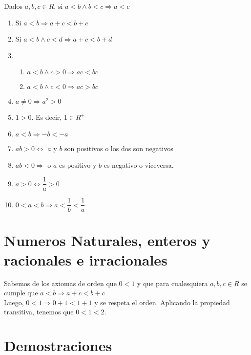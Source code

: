 \documentclass[10pt]{article}
\begin{document}
\newpage

\begin{theo}{}
Dados $a,b,c \in R$, si $a<b \land b<c \Rightarrow a<c$
\begin{multicols}{2}
\begin{enumerate}
\item Si $a<b \Rightarrow a+c < b+c$
\item Si $a<b \land c<d \Rightarrow a+c < b+d$
\item \begin{enumerate}
\item $a<b \land c>0 \Rightarrow ac < bc$
\item $a<b \land c<0 \Rightarrow ac > bc$
\end{enumerate}
\item $a \not = 0 \Rightarrow a^2 > 0$
\item $1 > 0$. Es decir, $1 \in R^+$
\item $a < b \Rightarrow -b < -a$
\item $ab > 0 \iff$ $a$ y $b$ son positivos o los dos son negativos
\item $ab < 0 \Rightarrow$ o $a$ es positivo y $b$ es negativo o viceversa.
\item $a>0 \iff \dfrac{1}{a} > 0$
\item $0<a<b \Rightarrow a<\dfrac{1}{b}<\dfrac{1}{a}$
\end{enumerate}
\end{multicols} 
\end{theo}

\section{Numeros Naturales, enteros y racionales e irracionales}
Sabemos de los axiomas de orden que $0<1$ y que para cualesquiera $a,b,c \in R$ se cumple que $a<b \Rightarrow a+c<b+c$\\
Luego, $0<1 \Rightarrow 0+1<1+1$ y se respeta el orden. Aplicando la propiedad transitiva, tenemos que $0<1<2$.













\newpage
\section{Demostraciones}
\end{document}

